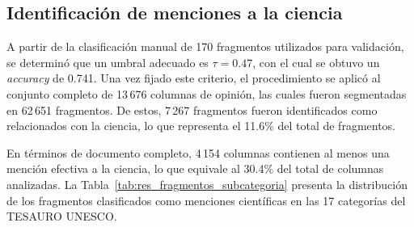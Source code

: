 \documentclass[11pt,a4paper]{article}
\begin{document}
	
	\subsection{Identificación de menciones a la ciencia}\label{sec:ident_menciones}


A partir de la clasificación manual de 170 fragmentos utilizados para validación, se determinó que un umbral adecuado es $\tau = 0.47$, con el cual se obtuvo un \emph{accuracy} de 0.741. Una vez fijado este criterio, el procedimiento se aplicó al conjunto completo de 13\,676 columnas de opinión, las cuales fueron segmentadas en 62\,651 fragmentos. De estos, 7\,267 fragmentos fueron identificados como relacionados con la ciencia, lo que representa el 11.6\% del total de fragmentos.

En términos de documento completo, 4\,154 columnas contienen al menos una mención efectiva a la ciencia, lo que equivale al 30.4\% del total de columnas analizadas. La Tabla~\ref{tab:res_fragmentos_subcategoria} presenta la distribución de los fragmentos clasificados como menciones científicas en las 17 categorías del TESAURO UNESCO.
	
\end{document}
